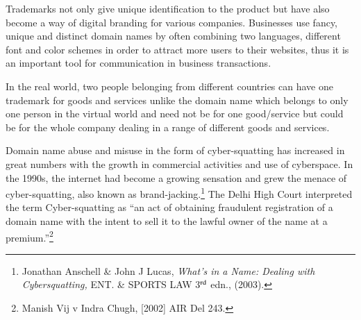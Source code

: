 \begin{multicols}{2}
\vspace{-.1cm}

\noi
Trademarks not only give unique identification to the product but have also become a way of
digital branding for various companies. Businesses use fancy, unique and distinct domain
names by often combining two languages, different font and color schemes in order to attract
more users to their websites, thus it is an important tool for communication in business
transactions.

\vspace{-.1cm}

\noi
In the real world, two people belonging from different countries can have one trademark for
goods and services unlike the domain name which belongs to only one person in the virtual
world and need not be for one good/service but could be for the whole company dealing in a
range of different goods and services.

\vspace{-.1cm}


\vspace{-.1cm}

\noi
Domain name abuse and misuse in the form of cyber-squatting has increased in great
numbers with the growth in commercial activities and use of cyberspace. In the 1990s, the
internet had become a growing sensation and grew the menace of cyber-squatting, also
known as brand-jacking.\footnote{Jonathan Anschell \& John J Lucas, \textit{What’s in a Name: Dealing with Cybersquatting,} ENT. \& SPORTS LAW 3$^{\rm rd}$ edn., (2003).} The Delhi High Court interpreted the term Cyber-squatting as “an
act of obtaining fraudulent registration of a domain name with the intent to sell it to the
lawful owner of the name at a premium.”\footnote{Manish Vij v Indra Chugh, [2002] AIR Del 243.}


\end{multicols}
